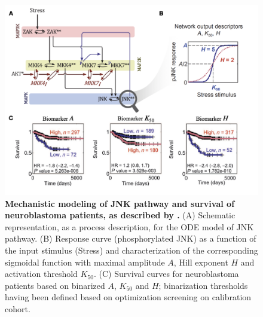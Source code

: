 \documentclass[a4paper,12pt,twoside,onecolumn,openright,final,oldfontcommands]{memoir}
\begin{document}
\begin{figure}

{\centering \includegraphics[width=0.9\linewidth]{fig/fey} 

}

\caption[Mechanistic modeling of JNK pathway and survival of neuroblastoma patients, as described by Fey et al.]{\textbf{Mechanistic modeling of JNK pathway and
survival of neuroblastoma patients, as described by
\citet{fey2015signaling}.} (A) Schematic representation, as a process
description, for the ODE model of JNK pathway. (B) Response curve
(phosphorylated JNK) as a function of the input stimulus (Stress) and
characterization of the corresponding sigmoidal function with maximal
amplitude \(A\), Hill exponent \(H\) and activation threshold
\(K_{50}\). (C) Survival curves for neuroblastoma patients based on
binarized \(A\), \(K_{50}\) and \(H\); binarization thresholds having
been defined based on optimization screening on calibration cohort.}\label{fig:fey}
\end{figure}
\end{document}
